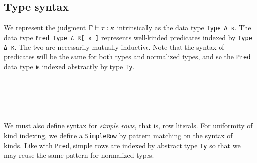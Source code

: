 \documentclass[authoryear, acmsmall, screen, review, nonacm]{acmart} %
\begin{document}
\subsection{Type syntax}

We represent the judgment $\Gamma \vdash \tau : \kappa$ intrinsically as the data type \verb!Type Δ κ!. The data type \verb!Pred Type Δ R[ κ ]! represents well-kinded predicates indexed by \verb!Type Δ κ!. The two are necessarily mutually inductive. Note that the syntax of predicates will be the same for both types and normalized types, and so the \verb!Pred! data type is indexed abstractly by type \verb!Ty!.

\begin{code}[hide]%
\>[0]\AgdaSpace{}%
\AgdaSpace{}%
\<%
\\
\>[0]\AgdaSpace{}%
\AgdaSpace{}%
\<%
\\
\>[0]\AgdaSpace{}%
\AgdaSpace{}%
\<%
\end{code}
\begin{code}%
\>[0]\AgdaSpace{}%
\AgdaSpace{}%
\AgdaSymbol{(}\AgdaSpace{}%
\AgdaSymbol{:}\AgdaSpace{}%
\AgdaSpace{}%
\AgdaSpace{}%
\AgdaSpace{}%
\AgdaSpace{}%
\AgdaSymbol{)}\AgdaSpace{}%
\AgdaSpace{}%
\AgdaSymbol{:}\AgdaSpace{}%
\AgdaSpace{}%
\AgdaSpace{}%
\<%
\\
\>[0]\AgdaSpace{}%
\AgdaSpace{}%
\AgdaSpace{}%
\AgdaSymbol{:}\AgdaSpace{}%
\AgdaSpace{}%
\AgdaSpace{}%
\<%
\end{code} 

We must also define syntax for \emph{simple rows}, that is, row literals. For uniformity of kind indexing, we define a \verb!SimpleRow! by pattern matching on the syntax of kinds. Like with \verb!Pred!, simple rows are indexed by abstract type \verb!Ty! so that we may reuse the same pattern for normalized types.
\end{document}
